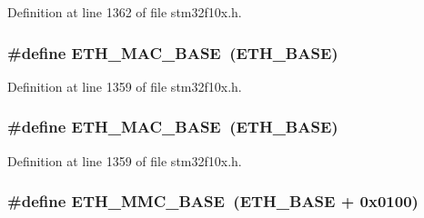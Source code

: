 Definition at line 1362 of file stm32f10x.\+h.

\subsubsection[{\texorpdfstring{E\+T\+H\+\_\+\+M\+A\+C\+\_\+\+B\+A\+SE}{ETH_MAC_BASE}}]{\setlength{\rightskip}{0pt plus 5cm}\#define E\+T\+H\+\_\+\+M\+A\+C\+\_\+\+B\+A\+SE~({\bf E\+T\+H\+\_\+\+B\+A\+SE})}\hypertarget{group___peripheral__memory__map_ga3cf7005808feb61bff1fee01e50a711a}{}\label{group___peripheral__memory__map_ga3cf7005808feb61bff1fee01e50a711a}


Definition at line 1359 of file stm32f10x.\+h.

\subsubsection[{\texorpdfstring{E\+T\+H\+\_\+\+M\+A\+C\+\_\+\+B\+A\+SE}{ETH_MAC_BASE}}]{\setlength{\rightskip}{0pt plus 5cm}\#define E\+T\+H\+\_\+\+M\+A\+C\+\_\+\+B\+A\+SE~({\bf E\+T\+H\+\_\+\+B\+A\+SE})}\hypertarget{group___peripheral__memory__map_ga3cf7005808feb61bff1fee01e50a711a}{}\label{group___peripheral__memory__map_ga3cf7005808feb61bff1fee01e50a711a}


Definition at line 1359 of file stm32f10x.\+h.

\subsubsection[{\texorpdfstring{E\+T\+H\+\_\+\+M\+M\+C\+\_\+\+B\+A\+SE}{ETH_MMC_BASE}}]{\setlength{\rightskip}{0pt plus 5cm}\#define E\+T\+H\+\_\+\+M\+M\+C\+\_\+\+B\+A\+SE~({\bf E\+T\+H\+\_\+\+B\+A\+SE} + 0x0100)}\hypertarget{group___peripheral__memory__map_ga4946f2b3b03f7998343ac1778fbcf725}{}\label{group___peripheral__memory__map_ga4946f2b3b03f7998343ac1778fbcf725}


